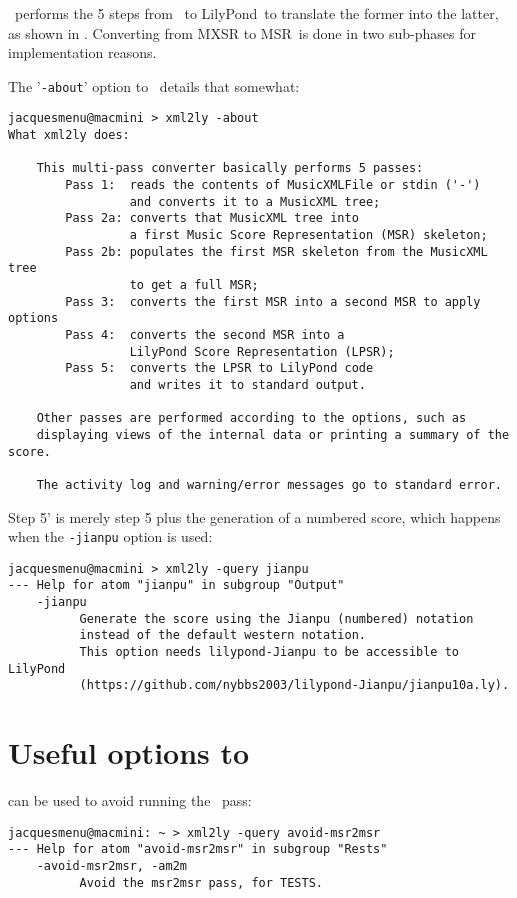 \xmlToLy\ performs the 5 steps from \mxml\ to LilyPond\ to translate the former into the latter, as shown in . Converting from MXSR to MSR\ is done in two sub-phases for implementation reasons.

The '{\tt -about}' option to \xmlToLy\ details that somewhat:
\begin{lstlisting}[language=MusicXML]
jacquesmenu@macmini > xml2ly -about
What xml2ly does:

    This multi-pass converter basically performs 5 passes:
        Pass 1:  reads the contents of MusicXMLFile or stdin ('-')
                 and converts it to a MusicXML tree;
        Pass 2a: converts that MusicXML tree into
                 a first Music Score Representation (MSR) skeleton;
        Pass 2b: populates the first MSR skeleton from the MusicXML tree
                 to get a full MSR;
        Pass 3:  converts the first MSR into a second MSR to apply options
        Pass 4:  converts the second MSR into a
                 LilyPond Score Representation (LPSR);
        Pass 5:  converts the LPSR to LilyPond code
                 and writes it to standard output.

    Other passes are performed according to the options, such as
    displaying views of the internal data or printing a summary of the score.

    The activity log and warning/error messages go to standard error.
\end{lstlisting}

Step 5' is merely step 5 plus the generation of a numbered score, which happens when the {\tt -jianpu} option is used:
\begin{lstlisting}[language=Terminal]
jacquesmenu@macmini > xml2ly -query jianpu
--- Help for atom "jianpu" in subgroup "Output"
    -jianpu
          Generate the score using the Jianpu (numbered) notation
          instead of the default western notation.
          This option needs lilypond-Jianpu to be accessible to LilyPond
          (https://github.com/nybbs2003/lilypond-Jianpu/jianpu10a.ly).
\end{lstlisting}


\section{Useful options to \xmlToLy\ }

 can be used to avoid running the \msrToMsr\ pass:
\begin{lstlisting}[language=Terminal]
jacquesmenu@macmini: ~ > xml2ly -query avoid-msr2msr
--- Help for atom "avoid-msr2msr" in subgroup "Rests"
    -avoid-msr2msr, -am2m
          Avoid the msr2msr pass, for TESTS.
\end{lstlisting}
